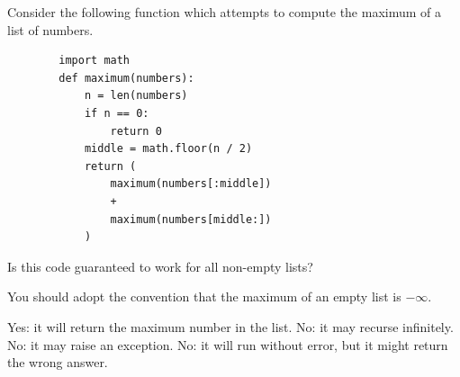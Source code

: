 \Needspace{3.5in}
\begin{prob}

    Consider the following function which attempts to compute the maximum of a list of
    numbers.

    \begin{verbatim}
        import math
        def maximum(numbers):
            n = len(numbers)
            if n == 0:
                return 0
            middle = math.floor(n / 2)
            return (
                maximum(numbers[:middle])
                +
                maximum(numbers[middle:])
            )
    \end{verbatim}

    Is this code guaranteed to work for all non-empty lists?

    You should adopt the convention that the maximum of an empty list is $-\infty$.

    \begin{choices}
        \choice Yes: it will return the maximum number in the list.
        \correctchoice No: it may recurse infinitely.
        \choice No: it may raise an exception.
        \choice No: it will run without error, but it might return the wrong answer.
    \end{choices}
\end{prob}
